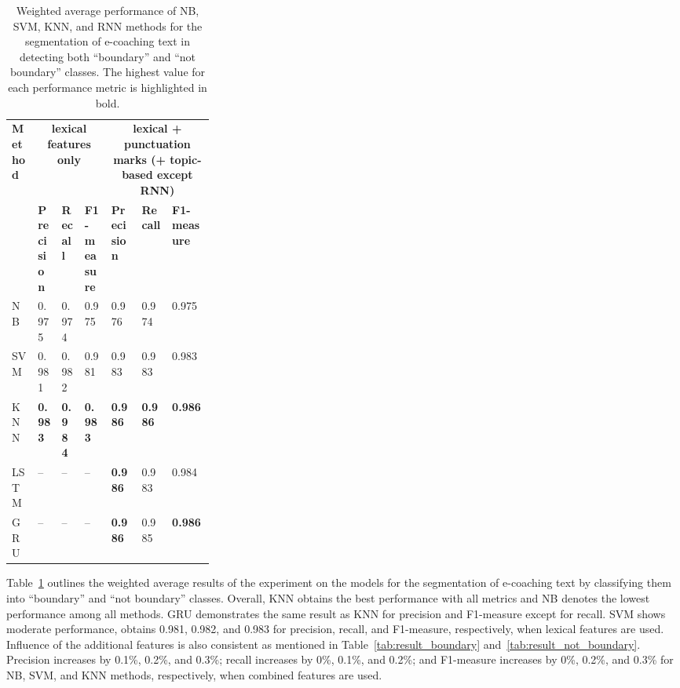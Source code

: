 \documentclass{amia}
\begin{document}
\begin{table}[ht]
\centering
\caption{Weighted average performance of NB, SVM, KNN, and RNN methods for the segmentation of e-coaching text in detecting both ``boundary'' and ``not boundary'' classes. The highest value for each performance metric is highlighted in bold.}
\label{tab:result_weighted_avg}
  \begin{tabular}{|l|l|l|l|p{0.15\linewidth}|p{0.15\linewidth}|l|}
  \hline
   \multirow{2}{*}{\textbf{Method}} & \multicolumn{3}{|c|}{\textbf{lexical features only}} & \multicolumn{3}{|c|}{\textbf{lexical + punctuation marks (+ topic-based except RNN)}} \\\cline{2-7}
   & \textbf{Precision}  & \textbf{Recall} & \textbf{F1-measure} & \textbf{Precision}  & \textbf{Recall} & \textbf{F1-measure}\\ \hline    
    
 NB & 0.975 & 0.974 & 0.975 & 0.976 & 0.974 & 0.975 \\ \hline
 SVM & 0.981 & 0.982 & 0.981 & 0.983 & 0.983 & 0.983\\ \hline
 KNN & \textbf{0.983} & \textbf{0.984} & \textbf{0.983} & \textbf{0.986} & \textbf{0.986} & \textbf{0.986}\\ \hline
 LSTM & -- & -- & -- & \textbf{0.986} & 0.983 & 0.984 \\ \hline
 GRU & -- & -- & -- & \textbf{0.986} & 0.985 & \textbf{0.986} \\ \hline 
  \end{tabular}
\end{table} 

Table~\ref{tab:result_weighted_avg} outlines the weighted average results of the experiment on the models for the segmentation of e-coaching text by classifying them into ``boundary'' and ``not boundary'' classes. Overall, KNN obtains the best performance with all metrics and NB denotes the lowest performance among all methods. GRU demonstrates the same result as KNN for precision and F1-measure except for recall. SVM shows moderate performance, obtains 0.981, 0.982, and 0.983 for precision, recall, and F1-measure, respectively, when lexical features are used. Influence of the additional features is also consistent as mentioned in Table~\ref{tab:result_boundary} and~\ref{tab:result_not_boundary}. Precision increases by 0.1\%, 0.2\%, and 0.3\%; recall increases by 0\%, 0.1\%, and 0.2\%; and F1-measure increases by 0\%, 0.2\%, and 0.3\% for NB, SVM, and KNN methods, respectively, when combined features are used.\\
\end{document}
